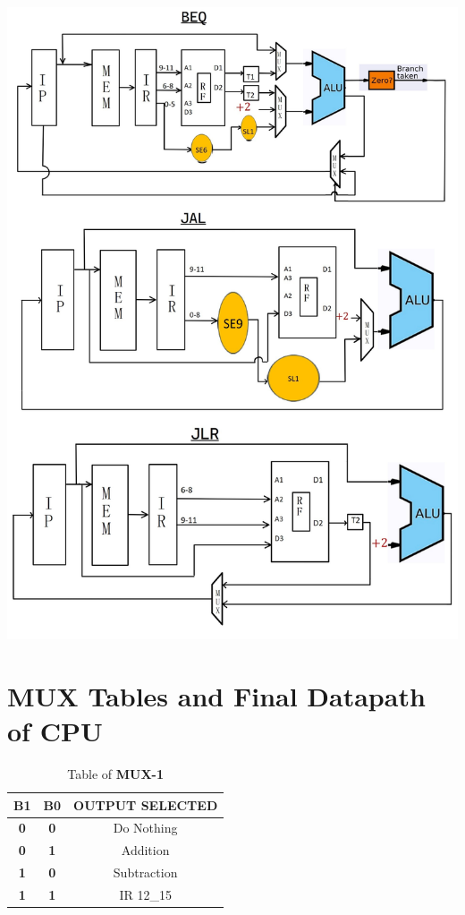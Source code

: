 \documentclass{article}
\begin{document}
    \begin{center}
          \includegraphics[width = 0.99\linewidth]{Images/3.jpg}
      \end{center}
\section{MUX Tables and Final Datapath of CPU}

\begin{table}[htb]
\centering
\begin{tabular}{|c|c|c|}
\hline
\rowcolor[HTML]{FFFC9E} 
\textbf{B1}                       & \textbf{B0}                       & \textbf{OUTPUT   SELECTED}         \\ \hline
{\color[HTML]{680100} \textbf{0}} & {\color[HTML]{680100} \textbf{0}} & {\color[HTML]{013300} Do Nothing}  \\ \hline
{\color[HTML]{680100} \textbf{0}} & {\color[HTML]{680100} \textbf{1}} & {\color[HTML]{013300} Addition}    \\ \hline
{\color[HTML]{680100} \textbf{1}} & {\color[HTML]{680100} \textbf{0}} & {\color[HTML]{013300} Subtraction} \\ \hline
{\color[HTML]{680100} \textbf{1}} & {\color[HTML]{680100} \textbf{1}} & {\color[HTML]{013300} IR 12\_15}   \\ \hline
\end{tabular}
\caption{Table of \textbf{MUX-1}}
\end{table}
\end{document}

